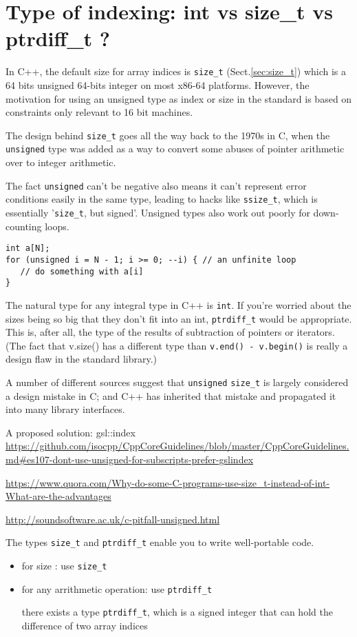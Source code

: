 \section{Type of indexing: int vs size\_t vs ptrdiff\_t ? }

In C++, the default size for array indices is \verb!size_t!
(Sect.\ref{sec:size_t}) which is a 64 bits unsigned 64-bits integer on most
x86-64 platforms. However, the motivation for using an unsigned type as index or
size in the standard is based on constraints only relevant to 16 bit machines.

The design behind \verb!size_t! goes all the way back to the 1970s in C, when the
\verb!unsigned! type was added as a way to convert some abuses of pointer arithmetic
over to integer arithmetic.

The fact \verb!unsigned! can’t be negative also means it can’t represent error
conditions easily in the same type, leading to hacks like \verb!ssize_t!, which is
essentially '\verb!size_t!, but signed'.
Unsigned types also work out poorly for down-counting loops.
\begin{verbatim}
int a[N];
for (unsigned i = N - 1; i >= 0; --i) { // an unfinite loop
   // do something with a[i]
}
\end{verbatim}


The natural type for any integral type in C++ is \verb!int!. If you're worried
about the sizes being so big that they don't fit into an int, \verb!ptrdiff_t!
would be appropriate. This is, after all, the type of the results of subtraction
of pointers or iterators. (The fact that v.size() has a different type than
\verb!v.end() - v.begin()! is really a design flaw in the standard library.)


A number of different sources suggest that \verb!unsigned! \verb!size_t! is
largely considered a design mistake in C; and C++ has inherited that mistake and
propagated it into many library interfaces.

A proposed solution: gsl::index
\url{https://github.com/isocpp/CppCoreGuidelines/blob/master/CppCoreGuidelines.md#es107-dont-use-unsigned-for-subscripts-prefer-gslindex}

\url{https://www.quora.com/Why-do-some-C-programs-use-size_t-instead-of-int-What-are-the-advantages}

\url{http://soundsoftware.ac.uk/c-pitfall-unsigned.html}

The types \verb!size_t! and \verb!ptrdiff_t! enable you to write well-portable code.
\begin{itemize}
  \item  for size : use \verb!size_t! 
  \item for any arrithmetic operation: use \verb!ptrdiff_t!
  
  there exists a type \verb!ptrdiff_t!, which is a signed integer that can hold the difference of two array indices
  
\end{itemize}

